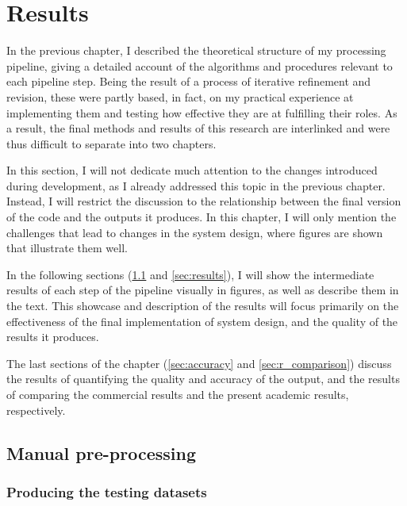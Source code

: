 
\chapter{Results}
\label{chap:r}

In the previous chapter, I described the theoretical structure of my processing pipeline, giving a detailed account of the algorithms and procedures relevant to each pipeline step. Being the result of a process of iterative refinement and revision, these were partly based, in fact, on my practical experience at implementing them and testing how effective they are at fulfilling their roles. As a result, the final methods and results of this research are interlinked and were thus difficult to separate into two chapters.

In this section, I will not dedicate much attention to the changes introduced during development, as I already addressed this topic in the previous chapter. Instead, I will restrict the discussion to the relationship between the final version of the code and the outputs it produces. In this chapter, I will only mention the challenges that lead to changes in the system design, where figures are shown that illustrate them well.

In the following sections (\ref{sec:manualpreprocessing} and \ref{sec:results}), I will show the intermediate results of each step of the pipeline visually in figures, as well as describe them in the text. This showcase and description of the results will focus primarily on the effectiveness of the final implementation of system design, and the quality of the results it produces.

The last sections of the chapter (\ref{sec:accuracy} and \ref{sec:r_comparison}) discuss the results of quantifying the quality and accuracy of the output, and the results of comparing the commercial results and the present academic results, respectively.

\section{Manual pre-processing}
\label{sec:manualpreprocessing}

\subsection{Producing the testing datasets}
\label{sub:testingdataproduction}

